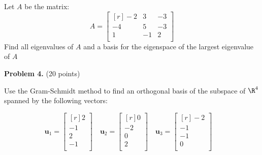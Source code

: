 \documentclass[12pt]{article}
\begin{document}
\clearpage


Let $A$ be the matrix:
\[A=
\begin{bmatrix*}[r]-2&3&-3\\-4&5&-3\\1&-1&2\\\end{bmatrix*}
\]
Find all eigenvalues of $A$ and a basis for the eigenspace of the largest eigenvalue of $A$



\clearpage

\textbf{Problem 4.} (20 points)

Use the Gram-Schmidt method to find an orthogonal basis of the subspace 
of $\R^{4}$ spanned by the following vectors:

\[
\mathbf{u}_1=\begin{bmatrix*}[r]2\\ -1\\ 2\\ -1\\ \end{bmatrix*}\quad
\mathbf{u}_2=\begin{bmatrix*}[r]0\\ -2\\ 0\\ 2\\ \end{bmatrix*}\quad
\mathbf{u}_3=\begin{bmatrix*}[r]-2\\ -1\\ -1\\ 0\\ \end{bmatrix*}\quad
\]

 
\end{document}
